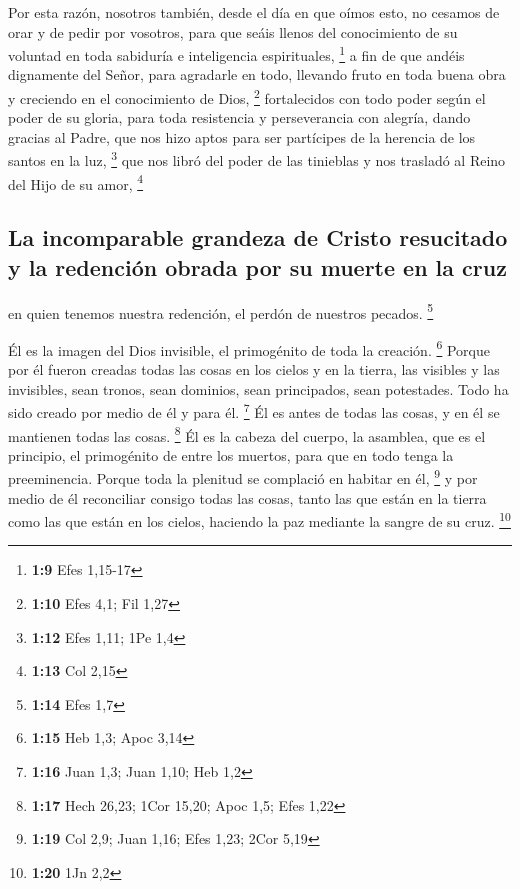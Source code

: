 \begin{paracol}{2}
 Por esta razón, nosotros también, desde el día en que
oímos esto, no cesamos de orar y de pedir por vosotros, para que seáis
llenos del conocimiento de su voluntad en toda sabiduría e inteligencia
espirituales, \footnote{\textbf{1:9} Efes 1,15-17}  a fin
de que andéis dignamente del Señor, para agradarle en todo, llevando
fruto en toda buena obra y creciendo en el conocimiento de Dios,
\footnote{\textbf{1:10} Efes 4,1; Fil 1,27}  fortalecidos
con todo poder según el poder de su gloria, para toda resistencia y
perseverancia con alegría,  dando gracias al Padre, que
nos hizo aptos para ser partícipes de la herencia de los santos en la
luz, \footnote{\textbf{1:12} Efes 1,11; 1Pe 1,4}  que nos
libró del poder de las tinieblas y nos trasladó al Reino del Hijo de su
amor, \footnote{\textbf{1:13} Col 2,15}

\hypertarget{la-incomparable-grandeza-de-cristo-resucitado-y-la-redenciuxf3n-obrada-por-su-muerte-en-la-cruz}{%
\subsection{La incomparable grandeza de Cristo resucitado y la redención
obrada por su muerte en la
cruz}\label{la-incomparable-grandeza-de-cristo-resucitado-y-la-redenciuxf3n-obrada-por-su-muerte-en-la-cruz}}

 en quien tenemos nuestra redención, el perdón de
nuestros pecados. \footnote{\textbf{1:14} Efes 1,7}

 Él es la imagen del Dios invisible, el primogénito de
toda la creación. \footnote{\textbf{1:15} Heb 1,3; Apoc 3,14}
 Porque por él fueron creadas todas las cosas en los
cielos y en la tierra, las visibles y las invisibles, sean tronos, sean
dominios, sean principados, sean potestades. Todo ha sido creado por
medio de él y para él. \footnote{\textbf{1:16} Juan 1,3; Juan 1,10; Heb
  1,2}  Él es antes de todas las cosas, y en él se
mantienen todas las cosas. \footnote{\textbf{1:17} Hech 26,23; 1Cor
  15,20; Apoc 1,5; Efes 1,22}  Él es la cabeza del
cuerpo, la asamblea, que es el principio, el primogénito de entre los
muertos, para que en todo tenga la preeminencia.  Porque
toda la plenitud se complació en habitar en él, \footnote{\textbf{1:19}
  Col 2,9; Juan 1,16; Efes 1,23; 2Cor 5,19}  y por medio
de él reconciliar consigo todas las cosas, tanto las que están en la
tierra como las que están en los cielos, haciendo la paz mediante la
sangre de su cruz. \footnote{\textbf{1:20} 1Jn 2,2}


\end{paracol}
